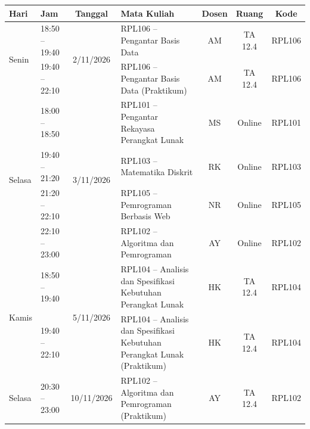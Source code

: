\documentclass[11pt,a4paper]{article}
\begin{document}
\begin{tabularx}{\textwidth}{@{} l l c X c c c @{}}
	\toprule
	\textbf{Hari} & \textbf{Jam}   & \textbf{Tanggal}            & \textbf{Mata Kuliah}                                                     & \textbf{Dosen}          & \textbf{Ruang} & \textbf{Kode} \\
	\midrule

	\multirow{2}{*}{Senin}
	              & 18:50 -- 19:40 & \multirow{2}{*}{2/11/2026}  & RPL106 -- Pengantar Basis Data                                           & AM                      & TA 12.4        & RPL106        \\
	              & 19:40 -- 22:10 &                             & RPL106 -- Pengantar Basis Data (Praktikum)                               & AM                      & TA 12.4        & RPL106        \\
	\midrule

	\multirow{4}{*}{Selasa}
	              & 18:00 -- 18:50 & \multirow{4}{*}{3/11/2026}  & RPL101 -- Pengantar Rekayasa Perangkat Lunak                             & MS                      & Online         & RPL101        \\
	              & 19:40 -- 21:20 &                             & RPL103 -- Matematika Diskrit                                             & RK                      & Online         & RPL103        \\
	              & 21:20 -- 22:10 &                             & RPL105 -- Pemrograman Berbasis Web                                       & NR                      & Online         & RPL105        \\
	              & 22:10 -- 23:00 &                             & RPL102 -- Algoritma dan Pemrograman                                      & AY                      & Online         & RPL102        \\
	\midrule

	\multirow{2}{*}{Kamis}
	              & 18:50 -- 19:40 & \multirow{2}{*}{5/11/2026}  & RPL104 -- Analisis dan Spesifikasi Kebutuhan Perangkat Lunak             & HK                      & TA 12.4        & RPL104        \\
	              & 19:40 -- 22:10 &                             & RPL104 -- Analisis dan Spesifikasi Kebutuhan Perangkat Lunak (Praktikum) & HK                      & TA 12.4        & RPL104        \\
	\midrule

	Selasa
	              & 20:30 -- 23:00 & 10/11/2026                  & RPL102 -- Algoritma dan Pemrograman (Praktikum)                          & AY                      & TA 12.4        & RPL102        \\
	\midrule


\end{tabularx}
\end{document}

